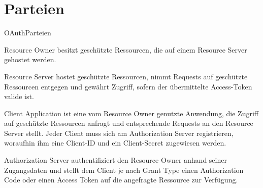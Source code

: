 \section{Parteien}\label{Parteien}
\begin{labeling}{OAuthParteien}
    \item [Resource Owner] besitzt geschützte Ressourcen, die auf einem Resource
    Server gehostet werden.
    \item [Resource Server] hostet geschützte Ressourcen, nimmt Requests auf
    geschützte Ressourcen entgegen und gewährt Zugriff, sofern der übermittelte
    Access-Token valide ist.
    \item [Client Application] ist eine vom Resource Owner genutzte Anwendung,
    die Zugriff auf geschützte Ressourcen anfragt und entsprechende Requests an
    den Resource Server stellt. Jeder Client muss sich am Authorization Server
    registrieren, woraufhin ihm eine Client-ID und ein Client-Secret zugewiesen
    werden.
    \item[Authorization Server] authentifiziert den Resource Owner anhand seiner
    Zugangsdaten und stellt dem Client je nach \gls{Grant Type} einen
    Authorization Code oder einen Access Token auf die angefragte Ressource zur
    Verfügung.
\end{labeling}
